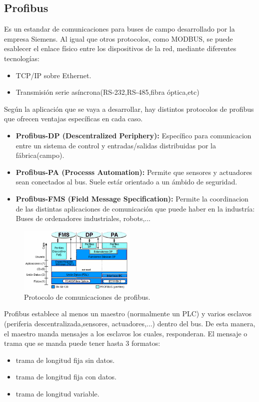 \subsection{Profibus}
\label{comunic_profibus}
Es un estandar de comunicaciones para buses de campo desarrollado por la empresa Siemens. Al igual que otros protocolos, como MODBUS, se puede esablecer el enlace físico entre los dispositivos de la red, mediante diferentes tecnologías:
\begin{itemize}
    \item TCP/IP sobre Ethernet.
    \item Transmisión serie asíncrona(RS-232,RS-485,fibra óptica,etc)
\end{itemize}
Según la aplicación que se vaya a desarrollar, hay distintos protocolos de profibus que ofrecen ventajas específicas en cada caso.
\begin{itemize}
    \item \textbf{Profibus-DP (Descentralized Periphery):} Específico para comunicacion entre un sistema de control y entradas/salidas distribuidas por la fábrica(campo).
    \item \textbf{Profibus-PA (Processs Automation):} Permite que sensores y actuadores sean conectados al bus. Suele estár orientado a un ámbido de seguridad.
    \item \textbf{Profibus-FMS (Field Message Specification):} Permite la coordinacion de las distintas aplicaciones de comunicación que puede haber en la industría: Buses de ordenadores industriales, robots,...
\end{itemize}
    \begin{figure}[H]
            \centering
            \includegraphics[width=0.5\textwidth]{images/protocolo_profibus.png}
            \caption{Protocolo de comunicaciones de profibus.}
            \label{fig:protocolo_profibus}
    \end{figure}
Profibus establece al menos un maestro (normalmente un PLC) y varios esclavos (periferia descentralizada,sensores, actuadores,...) dentro del bus. De esta manera, el maestro manda mensajes a los esclavos los cuales, responderan. El mensaje o trama que se manda puede tener hasta 3 formatos:
\begin{itemize}
    \item trama de longitud fija sin datos.
    \item trama de longitud fija con datos.
    \item trama de longitud variable.
\end{itemize}

